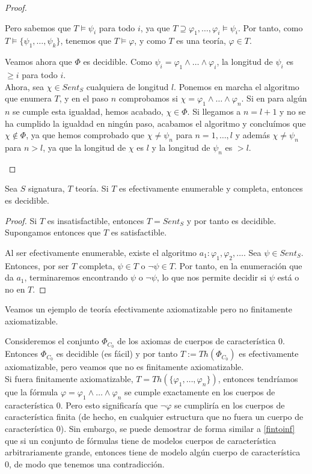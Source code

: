 \begin{proof}
\begin{itemize}
\begin{itemize}
        Pero sabemos que $T\vDash\psi_i$ para todo $i$, ya que $T\supseteq\varphi_1,\dots,\varphi_i\vDash\psi_i$. Por tanto, como $T\vDash\{\psi_1,\dots,\psi_k\}$, tenemos que $T\vDash\varphi$, y como  $T$ es una teoría, $\varphi\in T$.
    \end{itemize}
    Veamos ahora que $\Phi$ es decidible. Como $\psi_i=\varphi_1\land\dots\land\varphi_i$, la longitud de $\psi_i$ es $\geq i$ para todo $i$.\\
    
    Ahora, sea $\chi\in Sent_S$ cualquiera de longitud $l$. Ponemos en marcha el algoritmo que enumera $T$, y en el paso $n$ comprobamos si $\chi=\varphi_1\land\dots\land\varphi_n$. Si en para algún $n$ se cumple esta igualdad, hemos acabado, $\chi\in\Phi$. Si llegamos a $n=l+1$ y no se ha cumplido la igualdad en ningún paso, acabamos el algoritmo y concluímos que $\chi\notin\Phi$, ya que hemos comprobado que $\chi\neq\psi_n$ para $n=1,\dots,l$ y además $\chi\neq\psi_n$ para $n>l$, ya que la longitud de $\chi$ es $l$ y la longitud de $\psi_n$ es $>l$.
\end{itemize}
\end{proof}

\begin{prop*}
Sea $S$ signatura, $T$ teoría. Si $T$ es efectivamente enumerable y completa, entonces es decidible.
\end{prop*}
\begin{proof}
Si $T$ es insatisfactible, entonces $T = Sent_S$ y por tanto es decidible. Supongamos entonces que $T$ es satisfactible.

Al ser efectivamente enumerable, existe el algoritmo $a_1: \varphi_1, \varphi_2, \dots$. Sea $\psi \in Sent_S$. Entonces, por ser $T$ completa, $\psi \in T$ o $\neg\psi \in T$. Por tanto, en la enumeración que da $a_1$, terminaremos encontrando $\psi$ o $\neg \psi$, lo que nos permite decidir si $\psi$ está o no en $T$.
\end{proof}

\begin{example}
Veamos un ejemplo de teoría efectivamente axiomatizable pero no finitamente axiomatizable.

Consideremos el conjunto $\Phi_{C_0}$ de los axiomas de cuerpos de característica 0. Entonces $\Phi_{C_0}$ es decidible (es fácil) y por tanto $T := Th(\Phi_{C_0})$ es efectivamente axiomatizable, pero veamos que no es finitamente axiomatizable.\\

Si fuera finitamente axiomatizable, $T=Th(\{\varphi_1,\dots,\varphi_n\})$, entonces tendríamos que la fórmula $\varphi=\varphi_1\land\dots\land\varphi_n$ se cumple exactamente en los cuerpos de característica 0. Pero esto significaría que $\neg\varphi$ se cumpliría en los cuerpos de característica finita (de hecho, en cualquier estructura que no fuera un cuerpo de característica 0). Sin embargo, se puede demostrar de forma similar a \ref{fintoinf} que si un conjunto de fórmulas tiene de modelos cuerpos de característica arbitrariamente grande, entonces tiene de modelo algún cuerpo de característica 0, de modo que tenemos una contradicción.
\end{example}

